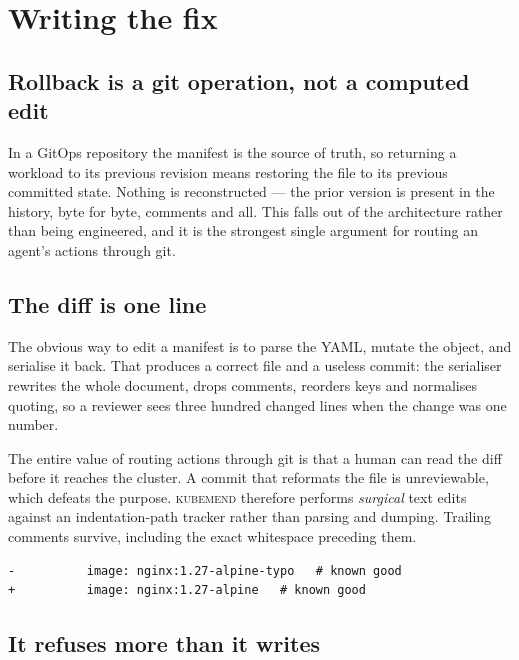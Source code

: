 \documentclass[11pt,a4paper]{article}
\newcommand{\kubemend}{\textsc{kubemend}}
\begin{document}
\section{Writing the fix}

\subsection{Rollback is a git operation, not a computed edit}

In a GitOps repository the manifest is the source of truth, so returning a
workload to its previous revision means restoring the file to its previous
committed state. Nothing is reconstructed --- the prior version is present in the
history, byte for byte, comments and all. This falls out of the architecture
rather than being engineered, and it is the strongest single argument for routing
an agent's actions through git.

\subsection{The diff is one line}

The obvious way to edit a manifest is to parse the YAML, mutate the object, and
serialise it back. That produces a correct file and a useless commit: the
serialiser rewrites the whole document, drops comments, reorders keys and
normalises quoting, so a reviewer sees three hundred changed lines when the
change was one number.

The entire value of routing actions through git is that a human can read the diff
before it reaches the cluster. A commit that reformats the file is unreviewable,
which defeats the purpose. \kubemend{} therefore performs \emph{surgical} text
edits against an indentation-path tracker rather than parsing and dumping.
Trailing comments survive, including the exact whitespace preceding them.

\begin{lstlisting}[caption={An emitted change. One line, comment and spacing intact.}]
-          image: nginx:1.27-alpine-typo   # known good
+          image: nginx:1.27-alpine   # known good
\end{lstlisting}

\subsection{It refuses more than it writes}
\end{document}
